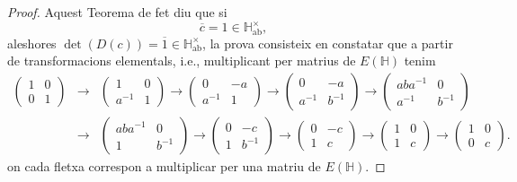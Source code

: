 \begin{proof}
Aquest Teorema de fet diu que si $$\overline{c}=1\in \mathbb{H}^\times_\text{ab},$$ aleshores $\det (D(c))=\overline{1}\in \mathbb{H}^\times_\text{ab}$, la prova consisteix en constatar que a partir de transformacions elementals, i.e., multiplicant per matrius de $E(\mathbb{H})$ tenim
\begin{eqnarray*}
\left( \begin{matrix}
  1 & 0 \\
  0 & 1
 \end{matrix} \right)
 &\rightarrow &
 \left( \begin{matrix}
  1 & 0 \\
  a^{-1} & 1
 \end{matrix} \right)
 \rightarrow
 \left( \begin{matrix}
  0 & -a \\
  a^{-1} & 1
 \end{matrix} \right)
 \rightarrow
 \left( \begin{matrix}
  0 & -a \\
  a^{-1} & b^{-1}
 \end{matrix} \right)
 \rightarrow
 \left( \begin{matrix}
  aba^{-1} & 0 \\
  a^{-1} & b^{-1}
 \end{matrix} \right)
 \\ &\rightarrow &
 \left( \begin{matrix}
  aba^{-1} & 0 \\
  1 & b^{-1}
 \end{matrix} \right)
 \rightarrow 
  \left( \begin{matrix}
  0 & -c \\
  1 & b^{-1}
 \end{matrix} \right)
 \rightarrow
  \left( \begin{matrix}
  0 & -c \\
  1 & c
 \end{matrix} \right)
 \rightarrow
  \left( \begin{matrix}
  1 & 0 \\
  1 & c
 \end{matrix} \right)
 \rightarrow
  \left( \begin{matrix}
  1 & 0 \\
  0 & c
 \end{matrix} \right).
\end{eqnarray*}
on cada fletxa correspon a multiplicar per una matriu de $E(\mathbb{H})$.
\end{proof}

